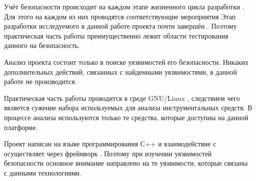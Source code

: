 \Sentence
Учёт безопасности происходит на каждом этапе жизненного цикла разработки 
 . 
\Sentence
Для этого на каждом из них проводятся соответствующие мероприятия 
\Sentence
Этап разработки исследуемого в данной работе проекта \PeerHood почти завершён 
. 
\Sentence
Поэтому практическая часть работы преимущественно лежит области тестирования данного 
 на безопасность.

\Sentence
Анализ проекта \PeerHood состоит только в поиске уязвимостей его безопасности.
\Sentence
Никаких дополнительных действий, связанных с найденными уязвимостями, в данной работе 
не производится.

\Sentence
Практическая часть работы проводится в среде GNU/Linux , следствием чего является 
сужение набора используемых для анализа инструментальных средств.
\Sentence
В процессе анализа используются только те средства, которые доступны на данной платформе.

\Sentence
Проект \PeerHood написан на языке программирования С++  и взаимодействие 
с  осуществляет через фреймворк \Qt {}.
\Sentence
Поэтому при изучении уязвимостей безопасности  основное внимание направлено 
на те уязвимости, которые связаны с данными технологиями.